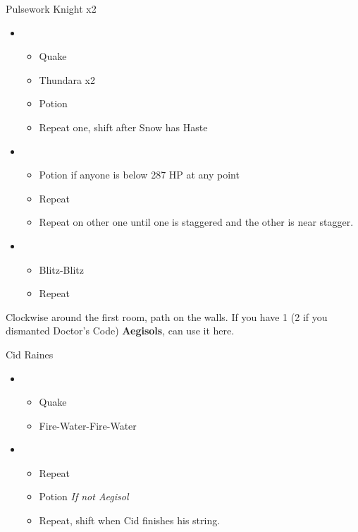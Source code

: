 \begin{multicols}{2}
  \begin{battle}{Pulsework Knight x2}
    \begin{itemize}
      \item \first
            \begin{itemize}
              \item Quake
              \item Thundara x2
              \item Potion
              \item Repeat one, shift after Snow has Haste
            \end{itemize}
      \item \second
            \begin{itemize}
              \item Potion if anyone is below 287 HP at any point
              \item Repeat
              \item Repeat on other one until one is staggered and the other is near stagger.
            \end{itemize}
      \item \sixth
            \begin{itemize}
              \item Blitz-Blitz
              \item Repeat
            \end{itemize}
    \end{itemize}
  \end{battle}
  Clockwise around the first room, path on the walls.
  If you have 1 (2 if you dismanted Doctor's Code) \textbf{Aegisols}, can use it here.
  \begin{battle}{Cid Raines}
    \begin{itemize}
      \item \first
            \begin{itemize}
              \item Quake
              \item Fire-Water-Fire-Water
            \end{itemize}
      \item \third
            \begin{itemize}
              \item Repeat
              \item Potion \textit{If not Aegisol}
              \item Repeat, shift when Cid finishes his string.

\end{itemize}
\end{itemize}
\end{battle}
\end{multicols}
